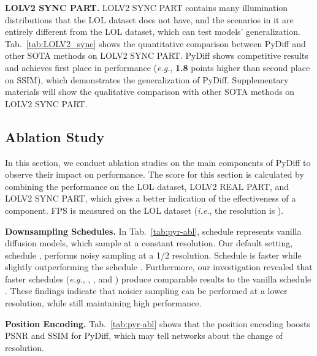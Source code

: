 \documentclass{article}
\def\eg{\emph{e.g.}}
\def\ie{\emph{i.e.}}
\begin{document}
\noindent \textbf{LOLV2 SYNC PART.}
LOLV2 SYNC PART contains many illumination distributions that the LOL dataset does not have, and the scenarios in it are entirely different from the LOL dataset, which can test models' generalization. Tab.~\ref{tab:LOLV2_sync} shows the quantitative comparison between PyDiff and other SOTA methods on LOLV2 SYNC PART. PyDiff shows competitive results and achieves first place in performance (\eg, \textbf{1.8} points higher than second place on SSIM), which demonstrates the generalization of PyDiff. Supplementary materials will show the qualitative comparison with other SOTA methods on LOLV2 SYNC PART.

\subsection{Ablation Study}
In this section, we conduct ablation studies on the main components of PyDiff to observe their impact on performance. The score for this section is calculated by combining the performance on the LOL dataset, LOLV2 REAL PART, and LOLV2 SYNC PART, which gives a better indication of the effectiveness of a component. FPS is measured on the LOL dataset (\ie, the resolution is ).



\noindent \textbf{Downsampling Schedules.}
In Tab.~\ref{tab:pyr-abl}, schedule  represents vanilla diffusion models, which sample at a constant resolution. Our default setting, schedule , performs noisy sampling at a 1/2 resolution.
Schedule  is  faster while slightly outperforming the schedule . 
Furthermore, our investigation revealed that faster schedules (\eg, , , and ) produce comparable results to the vanilla schedule . These findings indicate that noisier sampling can be performed at a lower resolution, while still maintaining high performance.

\noindent \textbf{Position Encoding.}
Tab.~\ref{tab:pyr-abl} shows that the position encoding boosts PSNR and SSIM for PyDiff, which may tell networks about the change of resolution.
\end{document}

